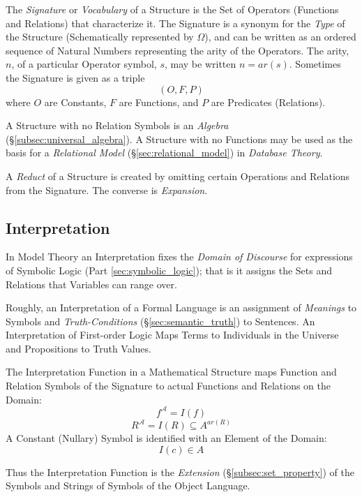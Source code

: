 The \emph{Signature} or \emph{Vocabulary} of a Structure is the Set of
Operators (Functions and Relations) that characterize it. The
Signature is a synonym for the \emph{Type} of the Structure
(Schematically represented by $\Omega$), and can be written as an
ordered sequence of Natural Numbers representing the arity of the
Operators. The arity, $n$, of a particular Operator symbol, $s$, may
be written $n=ar(s)$. Sometimes the Signature is given as a triple
\[
    (O,F,P)
\]
where $O$ are Constants, $F$ are Functions, and $P$ are Predicates
(Relations).

A Structure with no Relation Symbols is an \emph{Algebra}
(\S\ref{subsec:universal_algebra}). A Structure with no Functions may
be used as the basis for a \emph{Relational Model}
(\S\ref{sec:relational_model}) in \emph{Database Theory}.

A \emph{Reduct} of a Structure is created by omitting certain
Operations and Relations from the Signature. The converse is
\emph{Expansion}.



\subsection{Interpretation}\label{subsec:interpretation}

In Model Theory an Interpretation fixes the \emph{Domain of Discourse}
for expressions of Symbolic Logic (Part \ref{sec:symbolic_logic});
that is it assigns the Sets and Relations that Variables can range
over.

Roughly, an Interpretation of a Formal Language is an assignment of
\emph{Meanings} to Symbols and \emph{Truth-Conditions}
(\S\ref{sec:semantic_truth}) to Sentences. An Interpretation of
First-order Logic Maps Terms to Individuals in the Universe and
Propositions to Truth Values.

The Interpretation Function in a Mathematical Structure maps Function
and Relation Symbols of the Signature to actual Functions and
Relations on the Domain:
\[
    f^{\mathcal{A}} = I (f)
\]
\[
    R^{\mathcal{A}} = I (R) \subseteq A^{ar(R)}
\]
A Constant (Nullary) Symbol is identified with an Element of the
Domain:
\[
    I(c) \in A
\]

Thus the Interpretation Function is the \emph{Extension}
(\S\ref{subsec:set_property}) of the Symbols and Strings of Symbols of
the Object Language.

